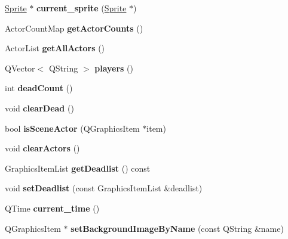 \begin{DoxyCompactItemize}
\hyperlink{class_sprite}{Sprite} $\ast$ {\bfseries current\+\_\+sprite} (\hyperlink{class_sprite}{Sprite} $\ast$)
\item 
\mbox{\label{class_game_scene_a748a3207ff433972a6ea24d2dbbb089d}} 
Actor\+Count\+Map {\bfseries get\+Actor\+Counts} ()
\item 
\mbox{\label{class_game_scene_a13d54b44f642489278e20b486678c686}} 
Actor\+List {\bfseries get\+All\+Actors} ()
\item 
\mbox{\label{class_game_scene_a8a811a7b2497a20b8e0757e2bdc26932}} 
Q\+Vector$<$ Q\+String $>$ {\bfseries players} ()
\item 
\mbox{\label{class_game_scene_a7077ce88eca56dee27ba8deae2c5c1bf}} 
int {\bfseries dead\+Count} ()
\item 
\mbox{\label{class_game_scene_a26ee4d4610a8fd5b9af762d8a3c2f8d7}} 
void {\bfseries clear\+Dead} ()
\item 
\mbox{\label{class_game_scene_aeb498f64c57482b7a340587c03f886d9}} 
bool {\bfseries is\+Scene\+Actor} (Q\+Graphics\+Item $\ast$item)
\item 
\mbox{\label{class_game_scene_aa55dfeaf2d458b5c05d4dc206f8022ed}} 
void {\bfseries clear\+Actors} ()
\item 
\mbox{\label{class_game_scene_a6971c7adf7fed708c747322324ee2045}} 
Graphics\+Item\+List {\bfseries get\+Deadlist} () const
\item 
\mbox{\label{class_game_scene_a18424ff3ed1d4c423a7ca20f2191983c}} 
void {\bfseries set\+Deadlist} (const Graphics\+Item\+List \&deadlist)
\item 
\mbox{\label{class_game_scene_a484d473ed3a7537aec18066a382480d2}} 
Q\+Time {\bfseries current\+\_\+time} ()
\item 
\mbox{\label{class_game_scene_ac5875684ca060591cad3f2e02c3c7a21}} 
Q\+Graphics\+Item $\ast$ {\bfseries set\+Background\+Image\+By\+Name} (const Q\+String \&name)

\end{DoxyCompactItemize}
